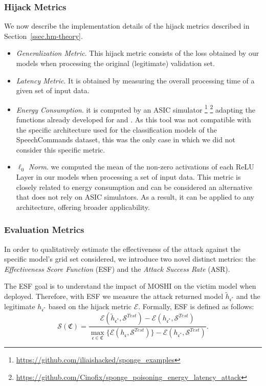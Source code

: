 \subsubsection{Hijack Metrics}
\label{subsub:hmetrics}
We now describe the implementation details of the hijack metrics described in Section~\ref{ssec.hm-theory}. 
\begin{itemize}
    \item \textit{Generalization Metric}. This hijack metric consists of the loss obtained by our models when processing the original (legitimate) validation set. 
    \item \textit{Latency Metric}. It is obtained by measuring the overall processing time of a given set of input data.
    \item \textit{Energy Consumption}. it is computed by an ASIC simulator \footnote{\url{https://github.com/iliaishacked/sponge_examples}} \footnote{\url{https://github.com/Cinofix/sponge_poisoning_energy_latency_attack}} adapting the functions already developed for \cite{shumailov2021sponge} and \cite{cina2022energy}. As this tool was not compatible with the specific architecture used for the classification models of the SpeechCommands dataset, this was the only case in which we did not consider this specific metric.
    \item \textit{$\ell_0$ Norm}. we computed the mean of the non-zero activations of each ReLU Layer in our models when processing a set of input data.
This metric is closely related to energy consumption and can be considered an alternative that does not rely on ASIC simulators. As a result, it can be applied to any architecture, offering broader applicability.
\end{itemize}

\subsubsection{Evaluation Metrics}
\label{subsub:emetrics}
In order to qualitatively estimate the effectiveness of the
attack against the specific model’s grid set considered, we
introduce two novel distinct metrics: the \textit{Effectiveness Score Function} (ESF) and the \textit{Attack Success Rate} (ASR).
\par
The ESF goal is to understand the impact of MOSHI on the victim model when deployed.
Therefore, with ESF we measure the attack returned model $\tilde{h}_{\mathfrak{c}^*}$ and the legitimate $h_{\mathfrak{c}^*}$ based on the hijack metric $\mathcal{E}$.
Formally, ESF is defined as follows:
\begin{equation}
     \mathscr{S}(\mathfrak{C}) = \frac{
         \mathcal{E} ( \tilde{h}_{\mathfrak{c}^*}, \mathcal{S}^{Test} ) 
         - 
         \mathcal{E} ( h_{\mathfrak{c}^*}, \mathcal{S}^{Test} )
     }
     {
         \underset{\mathfrak{c} \in \mathfrak{C}}{\max} \{\mathcal{E}(h_{\mathfrak{c}}, \mathcal{S}^{Test})\} - 
         \mathcal{E} (    h_{\mathfrak{c}^*}, \mathcal{S}^{Test}    )
     }.
\end{equation}


